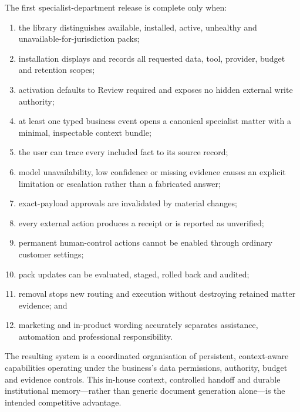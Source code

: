 The first specialist-department release is complete only when:

\begin{enumerate}[leftmargin=*]
  \item the library distinguishes available, installed, active, unhealthy and
        unavailable-for-jurisdiction packs;
  \item installation displays and records all requested data, tool, provider,
        budget and retention scopes;
  \item activation defaults to Review required and exposes no hidden external
        write authority;
  \item at least one typed business event opens a canonical specialist matter
        with a minimal, inspectable context bundle;
  \item the user can trace every included fact to its source record;
  \item model unavailability, low confidence or missing evidence causes an
        explicit limitation or escalation rather than a fabricated answer;
  \item exact-payload approvals are invalidated by material changes;
  \item every external action produces a receipt or is reported as unverified;
  \item permanent human-control actions cannot be enabled through ordinary
        customer settings;
  \item pack updates can be evaluated, staged, rolled back and audited;
  \item removal stops new routing and execution without destroying retained
        matter evidence; and
  \item marketing and in-product wording accurately separates assistance,
        automation and professional responsibility.
\end{enumerate}

The resulting system is a coordinated organisation of persistent,
context-aware capabilities operating under the business's data permissions,
authority, budget and evidence controls.  This in-house context, controlled
handoff and durable institutional memory---rather than generic document
generation alone---is the intended competitive advantage.
